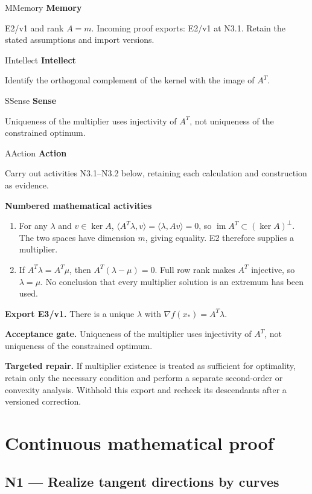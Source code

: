 \documentclass[preprint,12pt,aps,pra,showkeys,amsmath,amssymb,superscriptaddress,floatfix]{revtex4-2}
\theoremstyle{definition}
\theoremstyle{remark}
\newcommand{\mmfaculty}[3]{%
 \begin{mmfacultybox}{#1}{#2}
 {\sffamily\bfseries\color{MMBlue}#2}\par\smallskip #3
 \end{mmfacultybox}}
\newcommand{\field}[2]{\par\smallskip\noindent\textbf{#1.} #2\par}
\begin{document}
\mmfaculty{M}{Memory}{E2/v1 and rank \(A=m\). Incoming proof exports: E2/v1 at N3.1. Retain
the stated assumptions and import versions.}

\mmfaculty{I}{Intellect}{Identify the orthogonal complement of the kernel with the image of
\(A^T\).}

\mmfaculty{S}{Sense}{Uniqueness of the multiplier uses injectivity of \(A^T\), not uniqueness
of the constrained optimum.}

\mmfaculty{A}{Action}{Carry out activities N3.1--N3.2 below, retaining each calculation and
construction as evidence.}

\smallskip\noindent\textbf{Numbered mathematical activities}

\begin{enumerate}[label=N3.\arabic*,leftmargin=3.4em]

\item For any \(\lambda\) and \(v\in\ker A\),
\(\langle A^T\lambda,v\rangle=\langle\lambda,Av\rangle=0\), so
\(\operatorname{im}A^T\subset(\ker A)^\perp\). The two spaces have
dimension \(m\), giving equality. E2 therefore supplies a multiplier.

\item If \(A^T\lambda=A^T\mu\), then \(A^T(\lambda-\mu)=0\). Full row rank
makes \(A^T\) injective, so \(\lambda=\mu\). No conclusion that every
multiplier solution is an extremum has been used.

\end{enumerate}

\field{Export E3/v1}{There is a unique \(\lambda\) with \(\nabla f(x_*)=A^T\lambda\).}

\field{Acceptance gate}{Uniqueness of the multiplier uses injectivity of \(A^T\), not uniqueness
of the constrained optimum.}

\field{Targeted repair}{If multiplier existence is treated as sufficient for optimality, retain
only the necessary condition and perform a separate second-order or
convexity analysis. Withhold this export and recheck its descendants
after a versioned correction.}

\endgroup\clearpage\section{Continuous mathematical proof}\label{sec:proof}

\subsection{N1 --- Realize tangent directions by
curves}\label{n1-realize-tangent-directions-by-curves}
\end{document}

